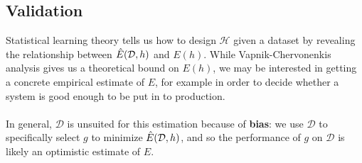 \subsection{Validation}
\label{validation}
Statistical learning theory tells us how to design $\mathcal{H}$ given a dataset by revealing the relationship between $\hat{E}(\mathcal{D}, h)$ and $E(h)$. While Vapnik-Chervonenkis analysis gives us a theoretical bound on $E(h)$, we may be interested in getting a concrete empirical estimate of $E$, for example in order to decide whether a system is good enough to be put in to production.
\\\\
In general, $\mathcal{D}$ is unsuited for this estimation because of \textbf{bias}: we use $\mathcal{D}$ to specifically select $g$ to minimize $\hat{E}(\mathcal{D}, h)$, and so the performance of $g$ on $\mathcal{D}$ is likely an optimistic estimate of $E$.

